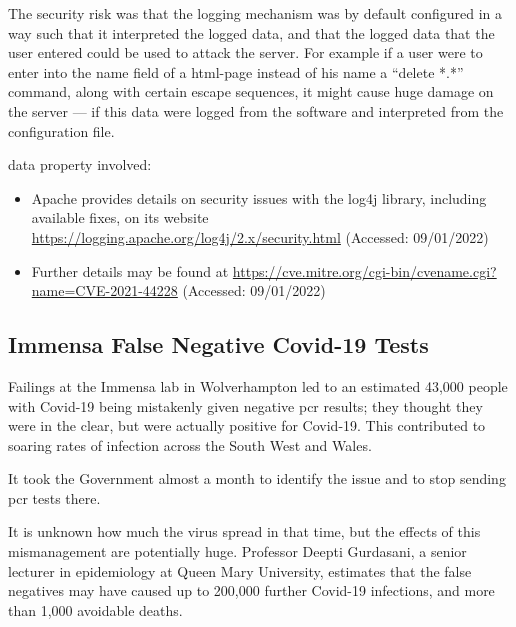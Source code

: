The security risk was that the logging mechanism was by default configured in a way such that it interpreted the logged data,
and that the logged data that the user entered could be used to attack the server.
For example if a user were to enter into the name field of a html-page instead of his name a ``delete *.*'' command, along with certain escape sequences,
it might cause huge damage on the server --- if this data were logged from the software and interpreted from the configuration file.

\Gls{data property} involved: 

\begin{itemize}
  \item Apache provides details on security issues with the log4j library, including available fixes, on its website \href{https://logging.apache.org/log4j/2.x/security.html}{https://logging.apache.org/log4j/2.x/security.html} (Accessed: 09/01/2022)
  \item Further details may be found at \href{https://cve.mitre.org/cgi-bin/cvename.cgi?name=CVE-2021-44228}{https://cve.mitre.org/cgi-bin/cvename.cgi?name=CVE-2021-44228} (Accessed: 09/01/2022)
\end{itemize}

\subsection{Immensa False Negative Covid-19  Tests} \label{bkm:incacc:immensa}
Failings at the Immensa lab in Wolverhampton led to an estimated 43,000 people with Covid-19 being mistakenly given negative \gls{pcr} results;
they thought they were in the clear, but were actually positive for Covid-19.
This contributed to soaring rates of infection across the South West and Wales.

It took the Government almost a month to identify the issue and to stop sending \gls{pcr} tests there.

It is unknown how much the virus spread in that time, but the effects of this mismanagement are potentially huge.
Professor Deepti Gurdasani, a senior lecturer in epidemiology at Queen Mary University,
estimates that the false negatives may have caused up to 200,000 further Covid-19 infections, and more than 1,000 avoidable deaths.

